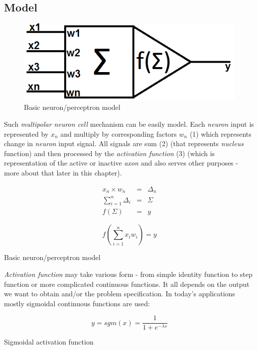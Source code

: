 \newpage
\subsection{Model}

\begin{figure}[!h]
    \centering
    \includegraphics[scale=0.5]{Media/Neuron.png}
    \caption{Basic neuron/perceptron model}
    \label{fig:NeuronModel}
\end{figure}

Such \textit{multipolar neuron cell} mechanism can be easily model\cite{sRpNAI369}. Each \textit{neuron} input is represented by $x_n$ and multiply by corresponding factors $w_n$ (1) which represents change in \textit{neuron} input signal. All signals are sum (2) (that represents \textit{nucleus} function) and then processed by the \textit{activation function} (3) (which is representation of the active or inactive \textit{axon} and also serves other purposes - more about that later in this chapter).

\begin{eqnarray}
x_n \times w_n &=& \Delta_n \\
\sum\limits_{i=1}^n \Delta_i &=& \Sigma \\
f(\Sigma) &=& y
\end{eqnarray}

\begin{mycapequ}[!ht]
    $$f\left(\sum\limits_{i=1}^n x_iw_i\right) = y$$
    \caption{Basic neuron/perceptron model}
    \label{formula:NeuronMathModelEquation}
\end{mycapequ}

\textit{Activation function} may take various form - from simple identity function to step function or more complicated continuous functions. It all depends on the output we want to obtain and/or the problem specification. In today's applications mostly sigmoidal continuous functions are used:

\begin{mycapequ}[!ht]
    $$y = sgm(x) = \frac{1}{1+e^{-\lambda s}}$$
    \caption{Sigmoidal activation function \cite{mlpFSaC}}
    \label{formula:SigmoidalActivationFunction}
\end{mycapequ}


